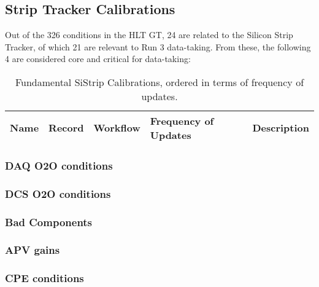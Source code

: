 \subsection{Strip Tracker Calibrations}

Out of the 326 conditions in the HLT GT, 24 are related to the Silicon Strip Tracker, of which 21 are relevant to Run 3 data-taking. From these, the following 4 are considered core and critical for data-taking:

\begin{table}[h!]
    \centering
    \begin{adjustbox}{max width=\textwidth}
    \begin{tabular}{p{3.5cm}|p{4cm}|p{2.5cm}|p{2cm}|p{4.5cm}}
        \textbf{Name} & \textbf{Record} & \textbf{Workflow} & \textbf{Frequency of Updates} & \textbf{Description} \\ \hline
    \end{tabular}
    \end{adjustbox}
    \caption{Fundamental SiStrip Calibrations, ordered in terms of frequency of updates.}
    \label{tab:StripCalibrations_critical}
\end{table}

\subsubsection{DAQ O2O conditions}

\subsubsection{DCS O2O conditions}

\subsubsection{Bad Components}

\subsubsection{APV gains}

\subsubsection{CPE conditions}